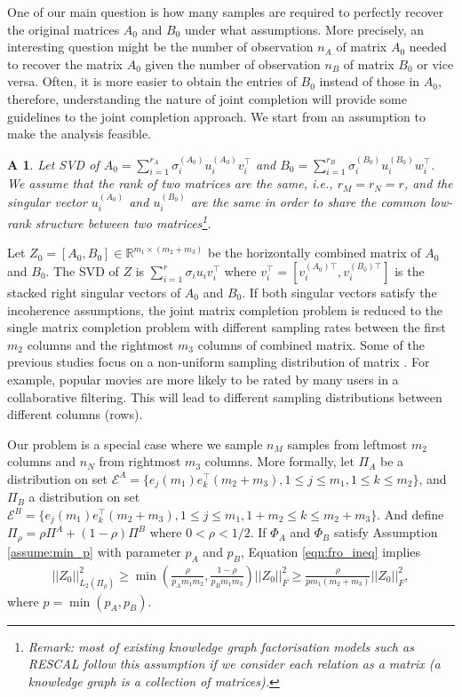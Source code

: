 \documentclass{article} %
\newtheorem{assumption}{A}
\newcommand\mc{\mathcal} %
\begin{document}
One of our main question is how many samples are required to perfectly recover the original matrices $A_0$ and $B_0$ under what assumptions. More precisely, an interesting question might be the number of observation $n_A$ of matrix $A_0$ needed to recover the matrix $A_0$ given the number of observation $n_B$ of matrix $B_0$ or vice versa. Often, it is more easier to obtain the entries of $B_0$ instead of those in $A_0$, therefore, understanding the nature of joint completion will provide some guidelines to the joint completion approach. We start from an assumption to make the analysis feasible.

\begin{assumption}\label{assume:share}
Let SVD of $A_0 = \sum_{i=1}^{r_A} \sigma_i^{(A_0)} u_i^{(A_0)} v_i^\top$ and $B_0 = \sum_{i=1}^{r_B} \sigma_i^{(B_0)} u_i^{(B_0)} w_i^\top$. We assume that the rank of two matrices are the same, i.e., $r_M = r_N = r$, and the singular vector $u_i^{(A_0)}$ and $u_i^{(B_0)}$ are the same in order to share the common low-rank structure between two matrices\footnote{Remark: most of existing knowledge graph factorisation models such as RESCAL follow this assumption if we consider each relation as a matrix (a knowledge graph is a collection of matrices).}.
\end{assumption}

Let $Z_0 = [A_0, B_0] \in \mathbb{R}^{m_1 \times (m_2+m_3)}$ be the horizontally combined matrix of $A_0$ and $B_0$. The SVD of $Z$ is $\sum_{i=1}^{r}\sigma_i u_i v_i^\top$ where $v_i^\top = [v_i^{(A_0)\top}, v_i^{(B_0)\top}]$ is the stacked right singular vectors of $A_0$ and $B_0$. If both singular vectors satisfy the incoherence assumptions, the joint matrix completion problem is reduced to the single matrix completion problem with different sampling rates between the first $m_2$ columns and the rightmost $m_3$ columns of combined matrix. Some of the previous studies focus on a non-uniform sampling distribution of matrix \cite{foygel2011learning,lounici2011optimal,negahban2012restricted,klopp2014noisy}. For example, popular movies are more likely to be rated by many users in a collaborative filtering. This will lead to different sampling distributions between different columns (rows). 

Our problem is a special case where we sample $n_M$ samples from leftmost $m_2$ columns and $n_N$ from rightmost $m_3$ columns. More formally, let $\Pi_A$ be a distribution on set $\mc{E}^{A} = \{e_j(m_1)e_k^\top(m_2+m_3), 1\leq j \leq m_1, 1\leq k \leq m_2\}$, and $\Pi_{B}$ a distribution on set $\mc{E}^{B} = \{e_j(m_1)e_k^\top(m_2+m_3), 1\leq j \leq m_1, 1+m_2\leq k \leq m_2+m_3\}$. And define $\Pi_\rho = \rho \Pi^{A} + (1-\rho)\Pi^{B}$ where $0 < \rho < 1/2$. If $\Phi_A$ and $\Phi_B$ satisfy Assumption \ref{assume:min_p} with parameter $p_A$ and $p_B$, Equation \ref{eqn:fro_ineq} implies
\begin{align}
||Z_0||_{L_2(\Pi_\rho)}^2 \geq \min(\frac{\rho}{p_Am_1m_2},\frac{1-\rho}{p_Bm_1m_3})||Z_0||_F^2 \geq \frac{\rho}{pm_1(m_2+m_3)} ||Z_0||_F^2,
\end{align}
where $p = \min(p_A, p_B)$.
\end{document}
